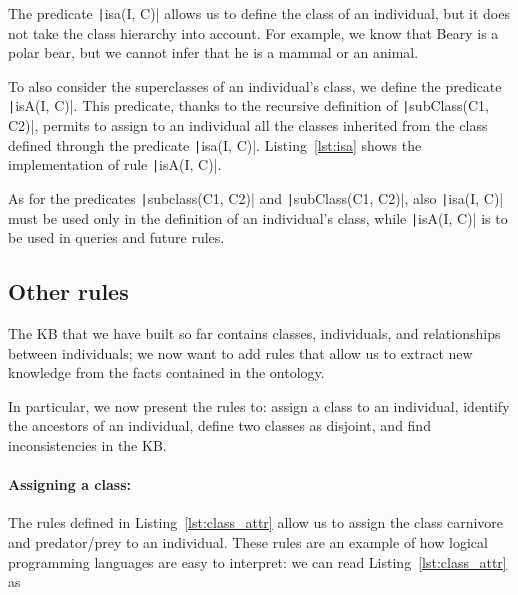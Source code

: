 The predicate \texttt|isa(I, C)| allows us to define the class of an individual, but it does not take the class hierarchy into account. For example, we know that Beary is a polar bear, but we cannot infer that he is a mammal or an animal.

To also consider the superclasses of an individual’s class, we define the predicate \texttt|isA(I, C)|. This predicate, thanks to the recursive definition of \texttt|subClass(C1, C2)|, permits to assign to an individual all the classes inherited from the class defined through the predicate \texttt|isa(I, C)|. Listing~\ref{lst:isa} shows the implementation of rule \texttt|isA(I, C)|.

\begin{listingenv}[h]
	\caption{isA predicate}
	\label{lst:isa}
\end{listingenv}

As for the predicates \texttt|subclass(C1, C2)| and \texttt|subClass(C1, C2)|, also \texttt|isa(I, C)| must be used only in the definition of an individual's class, while \texttt|isA(I, C)| is to be used in queries and future rules.

\subsection{Other rules}
The KB that we have built so far contains classes, individuals, and relationships between individuals; we now want to add rules that allow us to extract new knowledge from the facts contained in the ontology. 

In particular, we now present the rules to: assign a class to an individual, identify the ancestors of an individual, define two classes as disjoint, and find inconsistencies in the KB.

\paragraph{Assigning a class:} The rules defined in Listing~\ref{lst:class_attr} allow us to assign the class carnivore and predator/prey to an individual. These rules are an example of how logical programming languages are easy to interpret: we can read Listing~\ref{lst:class_attr} as 
\begin{listingenv}[h]
	\caption{Class attribution rules}
	\label{lst:class_attr}
\end{listingenv}

